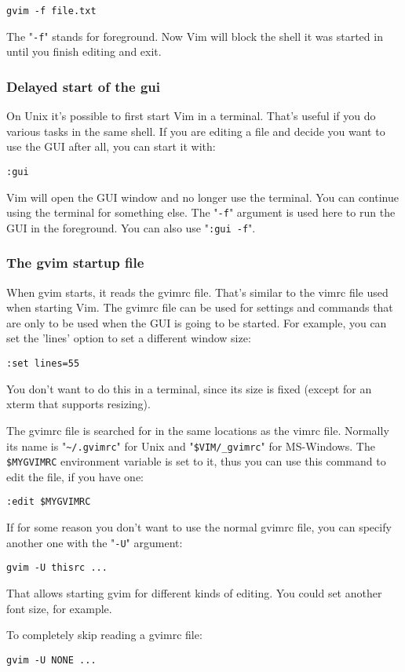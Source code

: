 \begin{Verbatim}[samepage=true]
 gvim -f file.txt
\end{Verbatim}

The "\verb!-f!" stands for foreground.
Now Vim will block the shell it was started in until you finish editing and exit.

\subsubsection{Delayed start of the gui}
On Unix it's possible to first start Vim in a terminal.
That's useful if you do various tasks in the same shell.
If you are editing a file and decide you want to use the GUI after all, you can start it with:

\begin{Verbatim}[samepage=true]
 :gui
\end{Verbatim}

Vim will open the GUI window and no longer use the terminal.
You can continue using the terminal for something else.
The "\verb!-f!" argument is used here to run the GUI in the foreground.
You can also use "\verb!:gui -f!".

\subsubsection{The gvim startup file}
When gvim starts, it reads the gvimrc file.
That's similar to the vimrc file used when starting Vim.
The gvimrc file can be used for settings and commands that are only to be used when the GUI is going to be started.
For example, you can set the 'lines' option to set a different window size:

\begin{Verbatim}[samepage=true]
 :set lines=55
\end{Verbatim}

You don't want to do this in a terminal, since its size is fixed (except for an xterm that supports resizing).

The gvimrc file is searched for in the same locations as the vimrc file.
Normally its name is "\verb!~/.gvimrc!" for Unix and "\verb!$VIM/_gvimrc!" for MS-Windows.
The \verb!$MYGVIMRC! environment variable is set to it, thus you can use this command to edit the file, if you have one:

\begin{Verbatim}[samepage=true]
 :edit $MYGVIMRC
\end{Verbatim}

If for some reason you don't want to use the normal gvimrc file, you can specify another one with the "\verb!-U!" argument:

\begin{Verbatim}[samepage=true]
 gvim -U thisrc ...
\end{Verbatim}

That allows starting gvim for different kinds of editing.
You could set another font size, for example.

To completely skip reading a gvimrc file:

\begin{Verbatim}[samepage=true]
 gvim -U NONE ...
\end{Verbatim}
\clearpage
